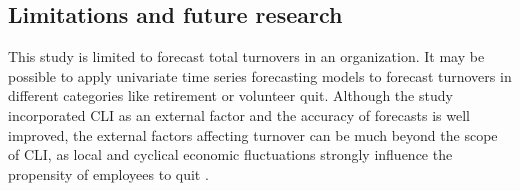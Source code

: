 \subsection{Limitations and future research}
This study is limited to forecast total turnovers in an organization. It may be possible to apply univariate time series forecasting models to forecast turnovers in different categories like retirement or volunteer quit. Although the study incorporated CLI as an external factor and the accuracy of forecasts is well improved, the external factors affecting turnover can be much beyond the scope of CLI, as local and cyclical economic fluctuations strongly influence the propensity of employees to quit \citep{abelson1984}.


